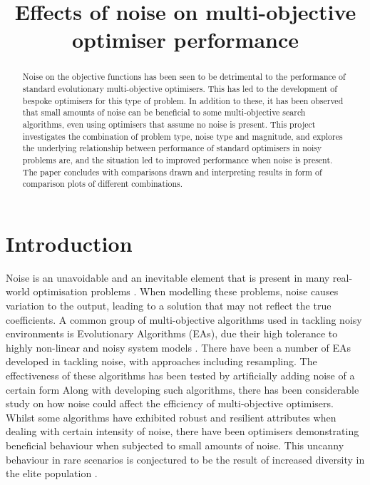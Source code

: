 \documentclass[conference,a4paper]{IEEEtran}
\begin{document}
\title{Effects of noise on multi-objective optimiser performance}

\author{       
}

\maketitle

\begin{abstract}
  Noise on the objective functions has been seen to be detrimental to the performance of standard evolutionary multi-objective optimisers. This has led to the development of bespoke optimisers for this type of problem. In addition to these, it has been observed that small amounts of noise can be beneficial to some multi-objective search algorithms, even using optimisers that assume no noise is present. This project investigates the combination of problem type, noise type and magnitude, and explores the underlying relationship between performance of standard optimisers in noisy problems are, and the situation led to improved performance when noise is present. The paper concludes with comparisons drawn and interpreting results in form of comparison plots of different combinations.
\end{abstract}


\section{Introduction}\label{sec:introduction}
Noise is an unavoidable and an inevitable element that is present in many real-world optimisation problems \cite{branke2003}. When modelling these problems, noise causes variation to the output, leading to a solution that may not reflect the true coefficients. A common group of multi-objective algorithms used in tackling noisy environments is Evolutionary Algorithms (EAs), due their high tolerance to highly non-linear and noisy system models \cite{then1994, hughes2001}. There have been a number of EAs developed in tackling noise, with approaches including resampling. The effectiveness of these algorithms has been tested by artificially adding noise of a certain form \cite{hughes2001} Along with developing such algorithms, there has been considerable study on how noise could affect the efficiency of multi-objective optimisers. Whilst some algorithms have exhibited robust and resilient attributes when dealing with certain intensity of noise, there have been optimisers demonstrating beneficial behaviour when subjected to small amounts of noise. This uncanny behaviour in rare scenarios is conjectured to be the result of increased diversity in the elite population \cite{fieldsend2015}.
\end{document}
